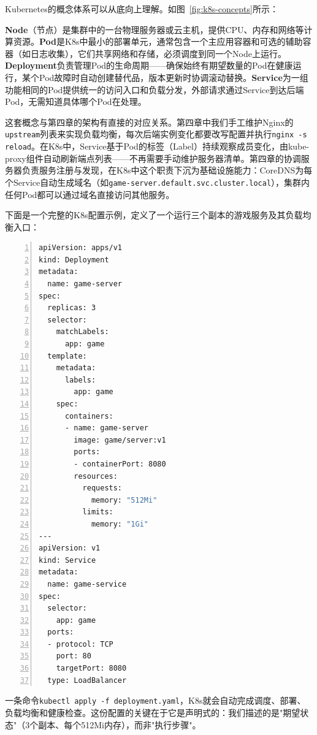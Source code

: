 Kubernetes的概念体系可以从底向上理解。如图~\ref{fig:k8s-concepts}所示：

\textbf{Node}（节点）是集群中的一台物理服务器或云主机，提供CPU、内存和网络等计算资源。\textbf{Pod}是K8s中最小的部署单元，通常包含一个主应用容器和可选的辅助容器（如日志收集），它们共享网络和存储，必须调度到同一个Node上运行。\textbf{Deployment}负责管理Pod的生命周期——确保始终有期望数量的Pod在健康运行，某个Pod故障时自动创建替代品，版本更新时协调滚动替换。\textbf{Service}为一组功能相同的Pod提供统一的访问入口和负载分发，外部请求通过Service到达后端Pod，无需知道具体哪个Pod在处理。

这套概念与第四章的架构有直接的对应关系。第四章中我们手工维护Nginx的\texttt{upstream}列表来实现负载均衡，每次后端实例变化都要改写配置并执行\texttt{nginx -s reload}。在K8s中，Service基于Pod的标签（Label）持续观察成员变化，由kube-proxy组件自动刷新端点列表——不再需要手动维护服务器清单。第四章的协调服务器负责服务注册与发现，在K8s中这个职责下沉为基础设施能力：CoreDNS为每个Service自动生成域名（如\texttt{game-server.default.svc.cluster.local}），集群内任何Pod都可以通过域名直接访问其他服务。

下面是一个完整的K8s配置示例，定义了一个运行三个副本的游戏服务及其负载均衡入口：

\begin{tcolorbox}[title=Kubernetes部署配置]
\begin{lstlisting}[language=bash,basicstyle=\ttfamily\footnotesize,numbers=left,numberstyle=\tiny\color{gray},numbersep=5pt,aboveskip=0pt,belowskip=0pt,lineskip=-1pt,commentstyle=\color{gray},keywordstyle=\color{blue}\bfseries,breaklines=true,showstringspaces=false]
apiVersion: apps/v1
kind: Deployment
metadata:
  name: game-server
spec:
  replicas: 3
  selector:
    matchLabels:
      app: game
  template:
    metadata:
      labels:
        app: game
    spec:
      containers:
      - name: game-server
        image: game/server:v1
        ports:
        - containerPort: 8080
        resources:
          requests:
            memory: "512Mi"
          limits:
            memory: "1Gi"
---
apiVersion: v1
kind: Service
metadata:
  name: game-service
spec:
  selector:
    app: game
  ports:
  - protocol: TCP
    port: 80
    targetPort: 8080
  type: LoadBalancer
\end{lstlisting}
\end{tcolorbox}

一条命令\texttt{kubectl apply -f deployment.yaml}，K8s就会自动完成调度、部署、负载均衡和健康检查。这份配置的关键在于它是声明式的：我们描述的是"期望状态"（3个副本、每个512Mi内存），而非"执行步骤"。

